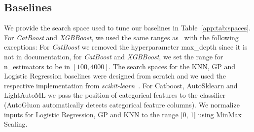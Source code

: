 \documentclass{article}
\begin{document}
\subsection{Baselines}\label{app:ssec:spaces}
We provide the search space used to tune our baselines in Table~\ref{app:tab:spaces}. For \textit{CatBoost} and \textit{XGBBoost}, we used the same ranges as~\citet{nnsfortabular2} with the following exceptions: For \textit{CatBoost} we removed the hyperparameter max\_depth since it is not in documentation, for \textit{CatBoost} and \textit{XGBBoost}, we set the range for n\_estimators to be in $[100, 4000]$. The search spaces for the KNN, GP and Logistic Regression baselines were designed from scratch and we used the respective implementation from \textit{scikit-learn}~\citep{scikit-learn}. For Catboost, AutoSklearn and LightAutoML we pass the position of categorical features to the classifier (AutoGluon automatically detects categorical feature columns). We normalize inputs for Logistic Regression, GP and KNN to the range [0, 1] using MinMax Scaling.
\end{document}

